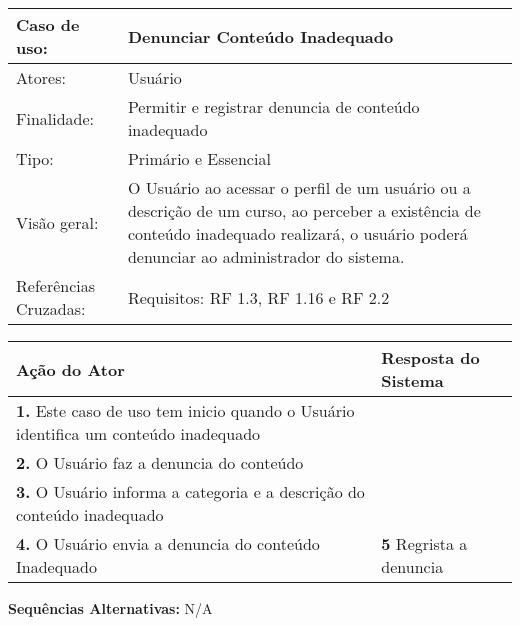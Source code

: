 \documentclass[12pt,a4paper,onecolumn,titlepage]{article}
\begin{document}
\begin{table}[h!]
\begin{center}
\begin{tabular}{p{2.5cm} p{9.5cm}}
Caso de uso: & \textbf{Denunciar Conteúdo Inadequado} \\ \hline
Atores: & Usuário \\ \hline
Finalidade: & Permitir e registrar denuncia de conteúdo inadequado\\ \hline
Tipo: & Primário e Essencial \\ \hline
Visão geral: & O Usuário ao acessar o perfil de um usuário ou a descrição de um curso, ao perceber a existência de conteúdo inadequado realizará, o usuário poderá denunciar ao administrador do sistema. \\ \hline
Referências Cruzadas: & Requisitos: RF 1.3, RF 1.16 e RF 2.2\\

\end{tabular}
\end{center}
\end{table} 


\begin{center}
\def\arraystretch{1.1}
\begin{tabular}{|p{6cm}|p{6cm}|}

\hline
\textbf{Ação do Ator} & \textbf{Resposta do Sistema} \\ \hline
\textbf{1.} Este caso de uso tem inicio quando o Usuário identifica um conteúdo inadequado & \\ \hline
\textbf{2.} O Usuário faz a denuncia do conteúdo  & \\ \hline
\textbf{3.} O Usuário informa a categoria e a descrição do conteúdo inadequado & \\ \hline
\textbf{4.} O Usuário envia a denuncia do conteúdo Inadequado & \textbf{5} Regrista a denuncia \\ \hline
\end{tabular}
\end{center}

\textbf{Sequências Alternativas:} N/A

\newpage
\end{document}
